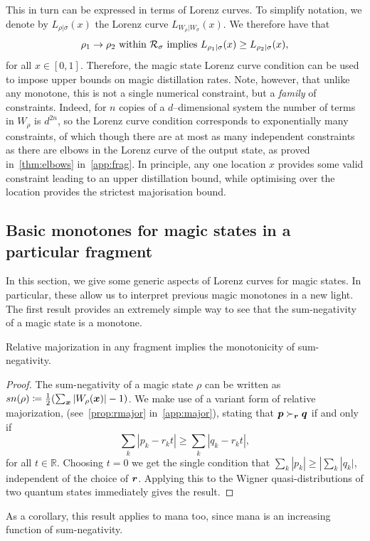 \documentclass[pra,
aps,
twocolumn,
superscriptaddress,
groupedaddress,
nofootinbib,
reprint
]{revtex4-1}
\begin{document}
This in turn can be expressed in terms of Lorenz curves. To simplify notation, we denote by $L_{\rho | \sigma}(x)$ the Lorenz curve $L_{W_{\rho} | W_{\sigma}} (x)$. We therefore have that
\begin{equation}
\rho_1 \rightarrow \rho_2 \mbox{ within }{\mathcal R}_\sigma \mbox{ implies } L_{\rho_1 |\sigma} (x) \ge L_{\rho_2 |\sigma} (x),
\end{equation}
for all $x \in [0,1]$. Therefore, the magic state Lorenz curve condition can be used to impose upper bounds on magic distillation rates. Note, however, that unlike any monotone, this is not a single numerical constraint, but a \emph{family} of constraints. Indeed, for $n$ copies of a $d$--dimensional system the number of terms in $W_{\rho}$ is $d^{2n}$, so the Lorenz curve condition corresponds to exponentially many constraints, of which though there are at most as many independent constraints as there are elbows in the Lorenz curve of the output state, as proved in~\cref{thm:elbows} in~\cref{app:frag}.
In principle, any one location $x$ provides some valid constraint leading to an upper distillation bound, while optimising over the location provides the strictest majorisation bound.

\subsection{Basic monotones for magic states in a particular fragment}
\label{sec:monotones_frag}

In this section, we give some generic aspects of Lorenz curves for magic states. In particular, these allow us to interpret previous magic monotones in a new light. The first result provides an extremely simple way to see that the sum-negativity of a magic state is a monotone.

\begin{lemma} Relative majorization in any fragment implies the monotonicity of sum-negativity. 
\end{lemma}
\begin{proof}
	The sum-negativity of a magic state $\rho$ can be written as $sn(\rho) \coloneqq \frac{1}{2} (\sum_{\boldsymbol{x}} |W_\rho(\boldsymbol{x}) | - 1)$.
We make use of a variant form of relative majorization, (see~\cref{prop:rmajor} in~\cref{app:major}), stating that $\boldsymbol{p} \succ_{\boldsymbol{r}} \boldsymbol{q}$ if and only if
	\begin{equation}
\sum_k | p_k - r_k t | \geq \sum_k | q_k - r_k t |,
\end{equation}
for all $t\in \mathbb{R}$. Choosing $t=0$ we get the single condition that $\sum_k |p_k| \ge |\sum_k |q_k|$, independent of the choice of $\boldsymbol{r}$. Applying this to the Wigner quasi-distributions of two quantum states immediately gives the result.
\end{proof}
As a corollary, this result applies to mana too, since mana is an increasing function of sum-negativity.
\end{document}
